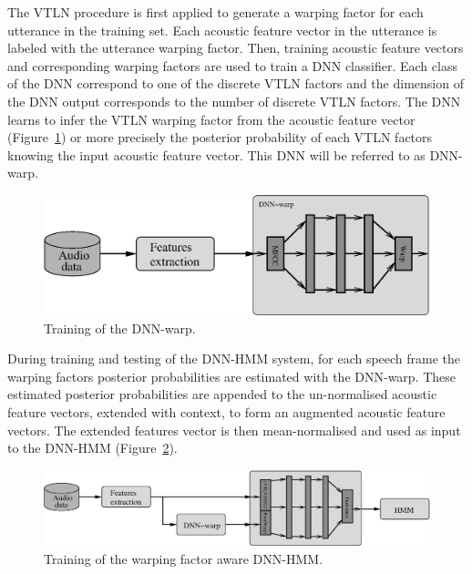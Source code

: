 \documentclass{nle}
\begin{document}
The VTLN procedure is first applied to generate a warping factor for
each  utterance in the  training set. Each acoustic feature vector in the utterance is labeled with the utterance warping factor. Then, training acoustic feature vectors and corresponding warping factors are used to train a DNN classifier. Each class of the DNN correspond to one of the discrete VTLN factors and the dimension of the DNN output corresponds to the number of discrete VTLN factors. The DNN learns to infer the VTLN warping factor from the acoustic feature vector (Figure~\ref{fig1}) or more precisely the posterior probability of each VTLN factors knowing the input acoustic feature vector. This DNN will be referred to as DNN-warp.
\begin{figure}
       \includegraphics[width=\textwidth]{fig1}
        \caption{Training of the DNN-warp.} 
   	\label{fig1}
\end{figure}

%


During training  and testing  of the DNN-HMM  system, for  each speech
frame the  warping factors posterior probabilities are  estimated with
the DNN-warp. These estimated  posterior probabilities are appended to
the un-normalised acoustic feature vectors, extended  with context, to
form an augmented acoustic feature vectors. The extended features vector
is then mean-normalised and used as input to the DNN-HMM (Figure~\ref{fig2}).
 \begin{figure}
       \includegraphics[width=\textwidth]{fig2}
         \caption{Training of the warping factor aware DNN-HMM.} 
    	\label{fig2}
 \end{figure}
 
\end{document}
